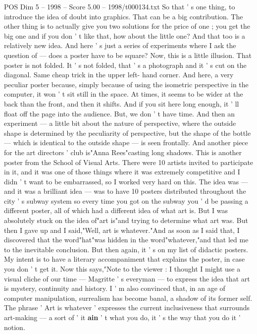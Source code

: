 \begin{textsample}{POS Dim 5 – 1998 – Score 5.00 – 1998/t000134.txt}
So that ' s one thing, to introduce the idea of doubt into graphics.
That can be a big contribution.
The other thing is to actually give you two solutions for the price of one ; you get the big one and if you don ' t like that, how about the little one?
And that too is a relatively new idea.
And here ' s just a series of experiments where I ask the question of — does a poster have to be square?
Now, this is a little illusion.
That poster is not folded.
It ' s not folded, that ' s a photograph and it ' s cut on the diagonal.
Same cheap trick in the upper left- hand corner.
And here, a very peculiar poster because, simply because of using the isometric perspective in the computer, it won ' t sit still in the space.
At times, it seems to be wider at the back than the front, and then it shifts.
And if you sit here long enough, it ' ll float off the page into the audience.
But, we don ' t have time.
And then an experiment — a little bit about the nature of perspective, where the outside shape is determined by the peculiarity of perspective, but the shape of the bottle — which is identical to the outside shape — is seen frontally.
And another piece for the art directors ' club is"Anna Rees"casting long shadows.
This is another poster from the School of Visual Arts.
There were 10 artists invited to participate in it, and it was one of those things where it was extremely competitive and I didn ' t want to be embarrassed, so I worked very hard on this.
The idea was — and it was a brilliant idea — was to have 10 posters distributed throughout the city ' s subway system so every time you got on the subway you ' d be passing a different poster, all of which had a different idea of what art is.
But I was absolutely stuck on the idea of"art is"and trying to determine what art was.
But then I gave up and I said,"Well, art is whatever."And as soon as I said that, I discovered that the word"hat"was hidden in the word"whatever,"and that led me to the inevitable conclusion.
But then again, it ' s on my list of didactic posters.
My intent is to have a literary accompaniment that explains the poster, in case you don ' t get it.
Now this says,"Note to the viewer : I thought I might use a visual cliche of our time — Magritte ' s everyman — to express the idea that art is mystery, continuity and history.
I ' m also convinced that, in an age of computer manipulation, surrealism has become banal, a shadow of its former self.
The phrase ' Art is whatever ' expresses the current inclusiveness that surrounds art-making — a sort of ' it \textbf{ain} ' t what you do, it ' s the way that you do it ' notion.

\end{textsample}
